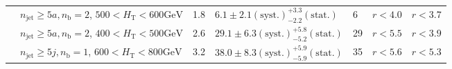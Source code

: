 \begin{table}[h!]
\begin{tabular}{ lllllll }
 & $n_{\mathrm{jet}} \geq5a,n_{\mathrm{b}} =2$, $500 < H_{\mathrm{T}} < 600 \mathrm{GeV}$ & 1.8 & $6.1 \pm 2.1 \mathrm{(syst.)} ^{+3.3}_{-2.2} \mathrm{(stat.)}$ & 6 & $r < 4.0$ & $r < 3.7$\\ 
 & $n_{\mathrm{jet}} \geq5a,n_{\mathrm{b}} =2$, $400 < H_{\mathrm{T}} < 500 \mathrm{GeV}$ & 2.6 & $29.1 \pm 6.3 \mathrm{(syst.)} ^{+5.8}_{-5.2} \mathrm{(stat.)}$ & 29 & $r < 5.5$ & $r < 3.9$\\ 
 & $n_{\mathrm{jet}} \geq5j,n_{\mathrm{b}} =1$, $600 < H_{\mathrm{T}} < 800 \mathrm{GeV}$ & 3.2 & $38.0 \pm 8.3 \mathrm{(syst.)} ^{+5.9}_{-5.9} \mathrm{(stat.)}$ & 35 & $r < 5.6$ & $r < 5.3$\\ 
    \hline
  \end{tabular}
\end{table}


